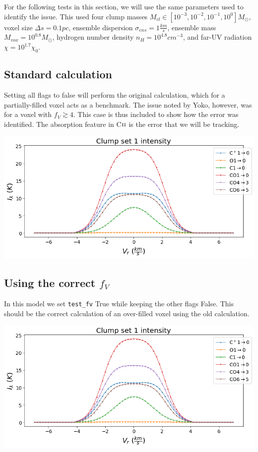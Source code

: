 \documentclass[a4paper]{article}
\newcommand{\mathsc}[1]{{\normalfont\textsc{#1}}}
\begin{document}
    For the following tests in this section, we will use the same parameters used to identify the issue.
    This used four clump masses \(M_{cl} \in [10^{-3}, 10^{-2}, 10^{-1}, 10^{0}] M_\odot\),
    voxel size \(\Delta s = 0.1 pc\),
    ensemble dispersion \(\sigma_{ens} = 1 \frac{km}{s}\),
    ensemble mass \(M_{vox} = 10^{0.8} M_\odot\),
    hydrogen number density \(n_H = 10^{4.8} cm^{-3}\),
    and far-UV radiation \(\chi = 10^{1.7} \chi_0\).

    \subsection{Standard calculation}

    Setting all flags to false will perform the original calculation, which for a partially-filled voxel acts as a benchmark.
    The issue noted by Yoko, however, was for a voxel with \(f_V \gtrsim 4\).
    This case is thus included to show how the error was identified.
    The absorption feature in C\(\mathsc{ii}\) is the error that we will be tracking.

    \includegraphics*[width=\linewidth]{voxel_error_original.png}

    \subsection{Using the correct \(f_V\)}

    In this model we set \texttt{test\_fv} True while keeping the other flags False.
    This should be the correct calculation of an over-filled voxel using the old calculation.

    \includegraphics*[width=\linewidth]{voxel_error_fv.png}
\end{document}
